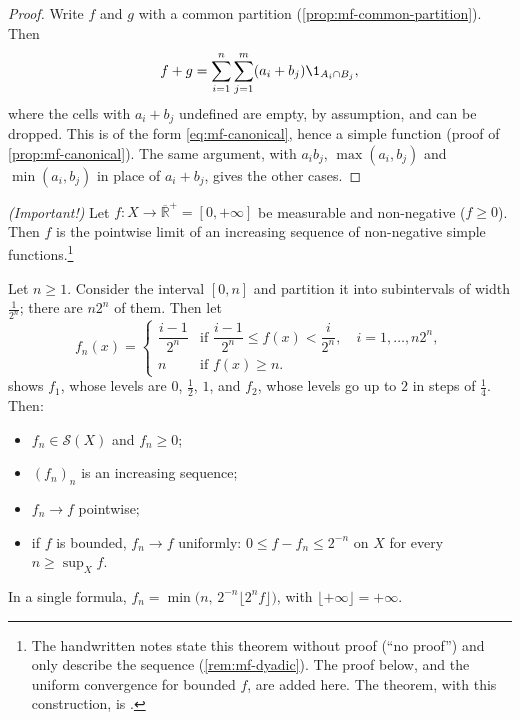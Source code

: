 \begin{proof}
Write $f$ and $g$ with a common partition (\cref{prop:mf-common-partition}). Then
\[
  f+g=\sum_{i=1}^n\sum_{j=1}^m(a_i+b_j)\1_{A_i\cap B_j},
\]
where the cells with $a_i+b_j$ undefined are empty, by assumption, and can be dropped. This is
of the form \eqref{eq:mf-canonical}, hence a simple function (proof of
\cref{prop:mf-canonical}). The same argument, with $a_ib_j$, $\max(a_i,b_j)$ and
$\min(a_i,b_j)$ in place of $a_i+b_j$, gives the other cases.
\end{proof}

\begin{theorem}\label{thm:mf-approximation}
\emph{(Important!)} Let $f:X\to\overline{\mathbb R}^+=[0,+\infty]$ be measurable and
non-negative ($f\ge0$). Then $f$ is the pointwise limit of an increasing sequence of
non-negative simple functions.\footnote{The handwritten notes state this theorem without proof
(``no proof'') and only describe the sequence (\cref{rem:mf-dyadic}). The proof below, and the
uniform convergence for bounded $f$, are added here. The theorem, with this construction, is
\citet[Theorem~13.5]{billingsley}.}
\end{theorem}

\begin{remark}\label{rem:mf-dyadic}
Let $n\ge1$. Consider the interval $[0,n]$ and partition it into subintervals of width
$\frac1{2^n}$; there are $n2^n$ of them. Then let
\begin{equation}\label{eq:mf-dyadic}
  f_n(x)=\begin{cases}
    \dfrac{i-1}{2^n} & \text{if } \dfrac{i-1}{2^n}\le f(x)<\dfrac{i}{2^n},\quad i=1,\dots,n2^n,\\[8pt]
    n & \text{if } f(x)\ge n .
  \end{cases}
\end{equation}
 shows $f_1$, whose levels are $0$, $\frac12$, $1$, and $f_2$, whose levels
go up to $2$ in steps of $\frac14$. Then:
\begin{itemize}
  \item $f_n\in\mathcal S(X)$ and $f_n\ge0$;
  \item $(f_n)_n$ is an increasing sequence;
  \item $f_n\to f$ pointwise;
  \item if $f$ is bounded, $f_n\to f$ uniformly: $0\le f-f_n\le2^{-n}$ on $X$ for every
    $n\ge\sup_Xf$.
\end{itemize}
In a single formula, $f_n=\min\big(n,\,2^{-n}\lfloor2^nf\rfloor\big)$, with
$\lfloor+\infty\rfloor=+\infty$.
\end{remark}

